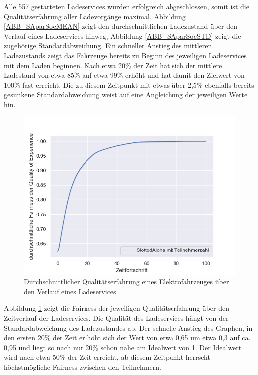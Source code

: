 Alle 557 gestarteten Ladeservices wurden erfolgreich abgeschlossen, somit ist die Qualitätserfahrung aller Ladevorgänge maximal. Abbildung \ref{ABB_SAparSocMEAN} zeigt den durchschnittlichen Ladezustand über den Verlauf eines Ladeservices hinweg, Abbildung \ref{ABB_SAparSocSTD} zeigt die zugehörige Standardabweichung. Ein schneller Anstieg des mittleren Ladezustands zeigt das Fahrzeuge bereits zu Beginn des jeweiligen Ladeservices mit dem Laden beginnen. Nach etwa 20\% der Zeit hat sich der mittlere Ladestand von etwa 85\% auf etwa 99\% erhöht und hat damit den Zielwert von 100\% fast erreicht. Die zu diesem Zeitpunkt mit etwas über 2,5\% ebenfalls bereits gesunkene Standardabweichung weist auf eine Angleichung der jeweiligen Werte hin.
\begin{figure}[htb]
\centering
	\includegraphics[scale=0.6]{img/SA_par/SlottedAloha_participants_VDE_tau_10_qoe.png}
	\caption{Durchschnittlicher Qualitätserfahrung eines Elektrofahrzeuges über den Verlauf eines Ladeservices}
	\label{Abb_SAparFairness}
\end{figure}
Abbildung \ref{Abb_SAparFairness} zeigt die Fairness der jeweiligen Qualitätserfahrung über den Zeitverlauf der Ladeservices. Die Qualität des Ladeservices hängt von der Standardabweichung des Ladezustandes ab. Der schnelle Anstieg des Graphen, in den ersten 20\% der Zeit er höht sich der Wert von etwa 0,65 um etwa 0,3 auf ca. 0,95 und liegt so nach nur 20\% schon nahe am Idealwert von 1. Der Idealwert wird nach etwa 50\% der Zeit erreicht, ab diesem Zeitpunkt herrscht höchstmögliche Fairness zwischen den Teilnehmern.

